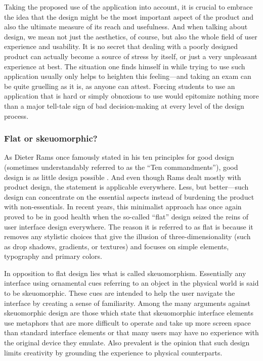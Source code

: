 \documentclass[thesis=M,english,hidelinks]{FITthesis}[2012/10/20]
\begin{document}
Taking the proposed use of the application into account, it is crucial to embrace the idea that the design might be the most important aspect of the product and also the ultimate measure of its reach and usefulness. And when talking about design, we mean not just the aesthetics, of course, but also the whole field of user experience and usability. It is no secret that dealing with a poorly designed product can actually become a source of stress by itself, or just a very unpleasant experience at best. The situation one finds himself in while trying to use such application usually only helps to heighten this feeling---and taking an exam can be quite gruelling as it is, as anyone can attest. Forcing students to use an application that is hard or simply obnoxious to use would epitomize nothing more than a major tell-tale sign of bad decision-making at every level of the design process.

    \subsubsection{Flat or skeuomorphic?}

As Dieter Rams once famously stated in his ten principles for good design (sometimes understandably referred to as the ``Ten commandments''), good design is as little design possible \cite{rams}. And even though Rams dealt mostly with product design, the statement is applicable everywhere. Less, but better---such design can concentrate on the essential aspects instead of burdening the product with non-essentials. In recent years, this minimalist approach has once again proved to be in good health when the so-called ``flat'' design seized the reins of user interface design everywhere. The reason it is referred to as flat is because it removes any stylistic choices that give the illusion of three-dimensionality (such as drop shadows, gradients, or textures) and focuses on simple elements, typography and primary colors.

In opposition to flat design lies what is called skeuomorphism. Essentially any interface using ornamental cues referring to an object in the physical world is said to be skeuomorphic. These cues are intended to help the user navigate the interface by creating a sense of familiarity. Among the many arguments against skeuomorphic design are those which state that skeuomorphic interface elements use metaphors that are more difficult to operate and take up more screen space than standard interface elements or that many users may have no experience with the original device they emulate. Also prevalent is the opinion that such design limits creativity by grounding the experience to physical counterparts.
\end{document}
